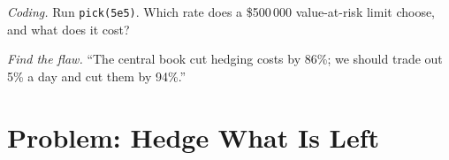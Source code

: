 \begin{exercise}[$\star\star\star$]\label{exo:s2:the-central-risk-book:7}
\emph{Coding.} Run \texttt{pick(5e5)}. Which rate does a \$500\,000 value-at-risk limit choose, and what does it cost?
\end{exercise}

\begin{exercise}[$\star\star\star$]\label{exo:s2:the-central-risk-book:8}
\emph{Find the flaw.} ``The central book cut hedging costs by 86\%; we should trade out 5\% a day and cut them by 94\%.''
\end{exercise}

\section{Problem: Hedge What Is Left}


